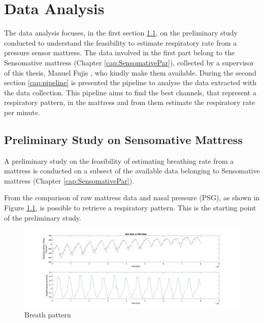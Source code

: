 \chapter{Data Analysis}

The data analysis focuses, in the first section \ref{cap:Preliminary}, on the preliminary study conducted to understand the feasibility to estimate respiratory rate from a pressure sensor mattress. The data involved in the first part belong to the Sensomative mattress (Chapter \ref{cap:SensomativePar}), collected by a supervisor of this thesis, Manuel Fujis \cite{ManuelZurich}, who kindly make them available.
During the second section \ref{cap:pipeline} is presented the pipeline to analyse the data extracted with the data collection. This pipeline aims to find the best channels, that represent a respiratory pattern, in the mattress and from them estimate the respiratory rate per minute.




\section{Preliminary Study on Sensomative Mattress} \label{cap:Preliminary}

A preliminary study on the feasibility of estimating breathing rate from a mattress is conducted on a subsect of the available data belonging to Sensomative mattress (Chapter \ref{cap:SensomativePar}).

From the comparison of raw mattress data and nasal pressure (PSG), as shown in Figure \ref{fig:breathPresent}, is possible to retrieve a respiratory pattern. This is the starting point of the preliminary study.\\


\begin{figure}[H]
    \centering   
    \includegraphics[width=\textwidth]{img/breath_presentation.jpg}
    \caption{Breath pattern}
    \label{fig:breathPresent}
\end{figure}

